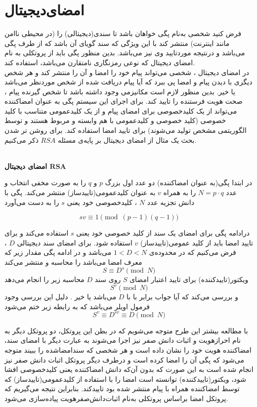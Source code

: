 
\chapter{امضای‌دیجیتال}
فرض کنید شخصی به‌نام پگی خواهان باشد تا سندی(دیجیتالی) را (در محیطی ناامن مانند اینترنت) منتشر کند با این ویژگی که سند گویای آن باشد که از طرف پگی می‌باشد و درنتیجه موردتایید وی نیز می‌باشد. بدین منظور پگی باید از پروتکلی به نام امضای دیجیتال که نوعی رمزنگاری نامتقارن می‌باشد، استفاده کند. 
\\
در امضای دیجیتال ، شخصی می‌تواند پیام خود را امضا و آن را منتشر کند و هر شخص دیگری با دیدن پیام و امضا  پی ببرد که آیا پیام دریافت شده از شخص موردنظر می‌باشد یا خیر. بدین منظور لازم است مکانیزمی وجود داشته باشد تا شخص گیرنده پیام ، صحت هویت فرستنده را تایید کند. برای اجرای این سیستم پگی به عنوان امضاکننده می‌تواند از یک کلیدخصوصی برای امضای پیام و از یک کلیدعمومی متناسب با کلید خصوصی (کلید خصوصی و کلید‌عمومی با هم وابسته و مربوط هستند و توسط الگوریتمی مشخص تولید می‌شوند) برای تایید امضا استفاده کند. برای روشن تر شدن بحث یک مثال از امضای دیجیتال بر پایه‌ی مسئله 
$RSA$
ذکر می‌کنیم.
\\
\\
\begin{example}\label{ex_rsa_sig}
	
\textbf{
 امضای دیجیتال 
$\textbf{RSA}$
}\label{ex_ds} {

}

در ابتدا پگی(به عنوان امضاکننده) دو عدد اول بزرگ  
$p$
و
$q$
را به صورت مخفی انتخاب و عدد
$N = p\cdot q$
را به همراه
$v$
 به عنوان کلید‌عمومی(تاییدساز)  منتشر می‌کند. پگی با دانش تجزیه عدد
$N$
، کلیدخصوصی خود یعنی 
$s$
را به دست می‌آورد

$$ sv \equiv 1 \pmod {(p-1) (q-1)}$$

درادامه پگی برای امضای یک سند از کلید خصوصی خود یعنی
$s$
استفاده می‌کند و برای تایید امضا باید از کلید عمومی(تاییدساز)
$v$
استفاده شود.
برای امضای سند دیجیتالی 
$D$
، فرض می‌کنیم که در محدوده‌ی 
$1 < D < N$
می‌باشد و در ادامه پگی مقدار زیر که معرف امضا می‌باشد را محاسبه و منتشر می‌کند
$$S \equiv D^s \pmod N$$ 
ویکتور(تاییدکننده) برای تایید اعتبار امضای 
$S$
روی سند
$D$
محاسبه زیر را انجام می‌دهد
$$ S^v \pmod N $$
و بررسی می‌کند که آیا جواب برابر با با 
$D$
می‌باشد یا خیر . دلیل این بررسی وجود فرمول اویلر می‌باشد که به رابطه زیر ختم می‌شود
$$ S^v \equiv D^{sv} \equiv D \pmod{N} $$

\end{example}
با مطالعه بیشتر این طرح متوجه می‌شویم که در بطن این پروتکل، دو پروتکل دیگر به نام  احراز‌هویت  و اثبات دانش صفر نیز اجرا می‌شوند به عبارت دیگر با امضای سند، امضاکننده هویت خود را نشان داده است و هر شخصی که سندامضاشده را ببیند متوجه می‌شود که پگی آن را امضا کرده است و درطرف دیگر پروتکل اثبات دانش صفر نیز انجام شده است به این صورت که بدون آن‌که دانش امضاکننده یعنی کلیدخصوصی افشا شود، ویکتور(تاییدکننده) توانسته است امضا را با استفاده از کلیدعمومی(تاییدساز) که توسط امضاکننده همراه با پیام  منتشر شده بود تاییدکند. بنابراین نتیجه می‌گیریم که پروتکل امضا براساس پروتکلی به‌نام اثبات‌دانش‌صفر‌هویت پیاده‌سازی می‌شود.

